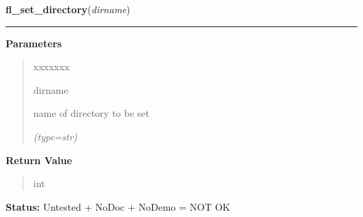     \label{xformslib:flgoodies:fl_set_directory}

    \vspace{0.5ex}

\hspace{.8\funcindent}\begin{boxedminipage}{\funcwidth}

    \raggedright \textbf{fl\_set\_directory}(\textit{dirname})

    \vspace{-1.5ex}

    \rule{\textwidth}{0.5\fboxrule}
\setlength{\parskip}{2ex}
\setlength{\parskip}{1ex}
      \textbf{Parameters}
      \vspace{-1ex}

      \begin{quote}
        \begin{Ventry}{xxxxxxx}

          \item[dirname]

          name of directory to be set

            {\it (type=str)}

        \end{Ventry}

      \end{quote}

      \textbf{Return Value}
    \vspace{-1ex}

      \begin{quote}
      int

      \end{quote}

\textbf{Status:} Untested + NoDoc + NoDemo = NOT OK



    \end{boxedminipage}

    \label{xformslib:flgoodies:fl_set_pattern}

    \vspace{0.5ex}

